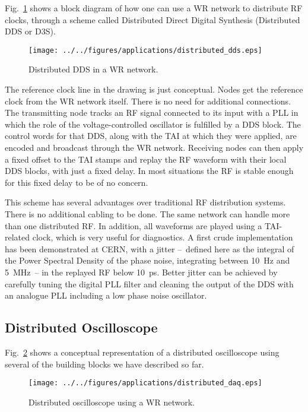 \documentclass{../JAC2003}
\begin{document}
Fig.~\ref{d3s-fig} shows a block diagram of how one can use a WR network
to distribute RF clocks, through a scheme called Distributed Direct
Digital Synthesis (Distributed DDS or D3S).    

\begin{figure}[htb]
   \centering
   \texttt{[image: ../../figures/applications/distributed\_dds.eps]}
   \caption{Distributed DDS in a WR network.}
   \label{d3s-fig}
\end{figure}

The reference clock line in the drawing is just conceptual. Nodes get
the reference clock from the WR network itself. There is no need for
additional connections. The transmitting node tracks an RF signal
connected to its input with a PLL in which the role of the
voltage-controlled oscillator is fulfilled by a DDS block. The control
words for that DDS, along with the TAI at which they were applied, are
encoded and broadcast through the WR network. Receiving nodes can then
apply a fixed offset to the TAI stamps and replay the RF waveform with
their local DDS blocks, with just a fixed delay. In most situations
the RF is stable enough for this fixed delay to be of no concern.

This scheme has several advantages over traditional RF distribution
systems. There is no additional cabling to be done. The same network
can handle more than one distributed RF. In addition, all waveforms
are played using a TAI-related clock, which is very useful for
diagnostics. A first crude implementation has been demonstrated at
CERN, with a jitter --~defined here as the integral of the Power
Spectral Density of the phase noise, integrating between 10~Hz and
5~MHz~-- in the replayed RF below 10~ps. Better jitter can be achieved
by carefully tuning the digital PLL filter and cleaning the output of
the DDS with an analogue PLL including a low phase noise oscillator.

\subsection{Distributed Oscilloscope}

Fig.~\ref{oscilloscope-fig} shows a conceptual representation of a
distributed oscilloscope using several of the building blocks we have
described so far. 

\begin{figure}[htb]
   \centering
   \texttt{[image: ../../figures/applications/distributed\_daq.eps]}
   \caption{Distributed oscilloscope using a WR network.}
   \label{oscilloscope-fig}
\end{figure}
\end{document}
